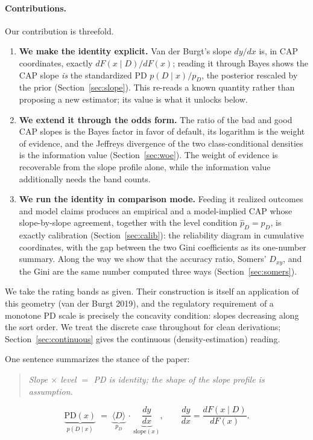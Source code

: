 \documentclass[12pt]{article}
\newcommand{\pD}{p_D}
\newcommand{\PDx}{p(D \mid x)}
\newcommand{\slope}{\mathrm{slope}}
\begin{document}
\paragraph{Contributions.} Our contribution is threefold.
\begin{enumerate}
\item \textbf{We make the identity explicit.} Van der Burgt's slope $dy/dx$ is, in CAP
coordinates, exactly $dF(x\mid D)/dF(x)$; reading it through Bayes shows the CAP slope \emph{is}
the standardized PD $\PDx/\pD$, the posterior rescaled by the prior (Section~\ref{sec:slope}).
This re-reads a known quantity rather than proposing a new estimator; its value is what it
unlocks below.
\item \textbf{We extend it through the odds form.} The ratio of the bad and good CAP slopes
is the Bayes factor in favor of default, its logarithm is the weight of evidence, and the
Jeffreys divergence of the two class-conditional densities is the information value
(Section~\ref{sec:woe}). The weight of evidence is recoverable from the slope profile alone,
while the information value additionally needs the band counts.
\item \textbf{We run the identity in comparison mode.} Feeding it realized outcomes and
model claims produces an empirical and a model-implied CAP whose slope-by-slope agreement,
together with the level condition $\hat p_D = \pD$, is exactly calibration
(Section~\ref{sec:calib}): the reliability diagram in cumulative coordinates, with the gap
between the two Gini coefficients as its one-number summary. Along the way we show that the accuracy
ratio, Somers' $D_{xy}$, and the Gini are the same number computed three ways
(Section~\ref{sec:somers}).
\end{enumerate}

We take the rating bands as given. Their construction is itself an application of this
geometry (van der Burgt 2019), and the regulatory requirement of a monotone PD scale is
precisely the concavity condition: slopes decreasing along the sort order. We treat the
discrete case throughout for clean derivations; Section~\ref{sec:continuous} gives the
continuous (density-estimation) reading.

One sentence summarizes the stance of the paper:
\begin{quote}
\emph{Slope $\times$ level $=$ PD is identity; the shape of the slope profile is assumption.}
\end{quote}
\begin{equation}
\underbrace{\text{PD}(x)}_{\PDx}
\;=\;
\underbrace{\langle D\rangle}_{\pD}
\,\cdot\,
\underbrace{\frac{dy}{dx}}_{\slope(x)},
\qquad \frac{dy}{dx}=\frac{dF(x\mid D)}{dF(x)}.
\end{equation}
\end{document}
